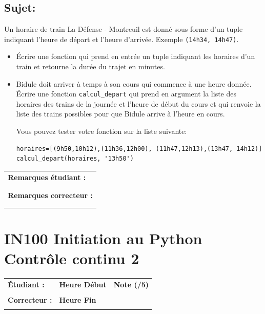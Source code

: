 \documentclass[a4paper,11pt]{article}
\begin{document}
\subsection*{Sujet:}

Un horaire de train La Défense - Montreuil est donné sous forme d'un tuple indiquant l'heure de départ et l'heure d'arrivée. Exemple \texttt{(14h34, 14h47)}. 

\begin{itemize}
\item[1.] \'Ecrire une fonction qui prend en entrée un tuple indiquant les horaires d'un train et retourne la durée du trajet en minutes. 
\item[2.] Bidule doit arriver à temps à son cours qui commence à une heure donnée. \'Ecrire une fonction \texttt{calcul\_depart} qui prend en argument la liste des horaires 
des trains  de la journée et l'heure de début du cours et qui renvoie la liste des trains possibles pour que Bidule  arrive à l'heure en cours. 

Vous pouvez tester votre fonction sur la liste suivante: 
\begin{verbatim}
horaires=[(9h50,10h12),(11h36,12h00), (11h47,12h13),(13h47, 14h12)]
calcul_depart(horaires, '13h50')
\end{verbatim}
\end{itemize}


\begin{table}[h!]
\centering
\renewcommand{\arraystretch}{1.4} %
\begin{tabular}{|p{15cm}|}
\hline
\textbf{Remarques étudiant :}    \\
 \\
 \\
\hline
\textbf{Remarques correcteur :}  \\
 \\
 \\
\hline
\end{tabular}
\end{table}


\newpage

\section*{\center IN100 Initiation au Python\\
Contrôle continu 2}


\begin{table}[h!]
\centering
\renewcommand{\arraystretch}{1.4} %
\begin{tabular}{|p{10cm}|p{3cm}|p{2cm}|}
\hline
\textbf{Étudiant :} & \textbf{Heure Début }  & \textbf{Note (/5) }  \\
& & \\
\hline
\textbf{Correcteur :} & \textbf{Heure Fin } & \\
& & \\
\hline

\hline
\end{tabular}
\end{table}
\end{document}
